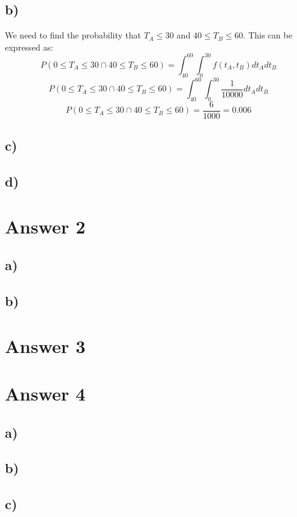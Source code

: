 \documentclass[12pt]{article}
\begin{document}
\subsection*{b)} 

 We need to find the probability that $ T_A \leq 30 $ and $ 40 \leq T_B \leq 60$. This can be expressed as:
$$ P\left(0 \leq T_A \leq 30 \cap 40 \leq T_B \leq 60\right)=\int_{40}^{60}\int_{0}^{30}  f\left(t_A, t_B\right) d t_A d t_B $$
 $$P\left(0 \leq T_A \leq 30 \cap 40 \leq T_B \leq 60\right)=\int_{40}^{60} \int_{0}^{30}  \frac{1}{10000} d t_A d t_B $$
$$P\left(0 \leq T_A \leq 30 \cap 40 \leq T_B \leq 60\right)=\frac{6}{1000} = 0.006 $$ 
 


\subsection*{c)} 

\subsection*{d)} 


\section*{Answer 2}

\subsection*{a)} 

\subsection*{b)} 


\section*{Answer 3}


\section*{Answer 4}

\subsection*{a)} 

\subsection*{b)} 

\subsection*{c)} 
\end{document}

